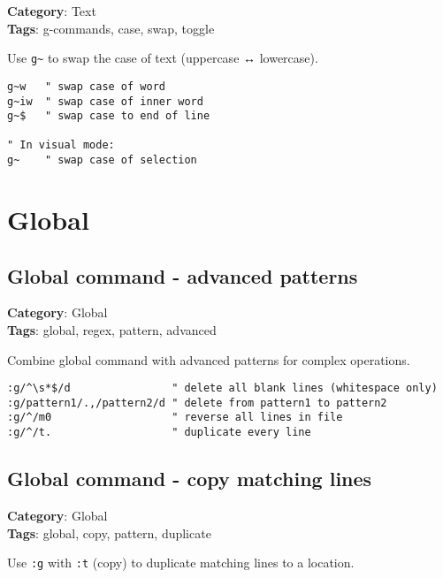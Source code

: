 {{{{{{\textbf{Category}: Text\\ \textbf{Tags}: g-commands, case, swap, toggle
\vspace{0.5cm}

Use {\footnotesize \Verb§g~§} to swap the case of text (uppercase ↔ lowercase).

\begin{Exa*}{}
\begin{Verbatim}[fontsize=\footnotesize, breaklines, breakanywhere]
g~w   " swap case of word
g~iw  " swap case of inner word
g~$   " swap case to end of line

" In visual mode:
g~    " swap case of selection
\end{Verbatim}
\end{Exa*}

\chapter{Global}
\section{Global command - advanced patterns}

\textbf{Category}: Global\\ \textbf{Tags}: global, regex, pattern, advanced
\vspace{0.5cm}

Combine global command with advanced patterns for complex operations.

\begin{Exa*}{}
\begin{Verbatim}[fontsize=\footnotesize, breaklines, breakanywhere]
:g/^\s*$/d                " delete all blank lines (whitespace only)
:g/pattern1/.,/pattern2/d " delete from pattern1 to pattern2
:g/^/m0                   " reverse all lines in file
:g/^/t.                   " duplicate every line
\end{Verbatim}
\end{Exa*}

\section{Global command - copy matching lines}

\textbf{Category}: Global\\ \textbf{Tags}: global, copy, pattern, duplicate
\vspace{0.5cm}

Use {\footnotesize \Verb§:g§} with {\footnotesize \Verb§:t§} (copy) to duplicate matching lines to a location.

}}}}}}
